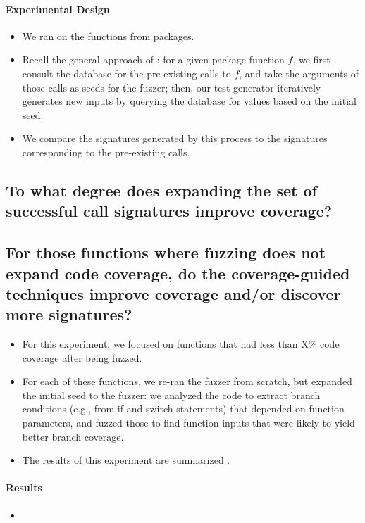 \paragraph{Experimental Design}
\begin{itemize}
    \item We ran \tool on the   functions from  packages.
    \item Recall the general approach of \tool: for a given package function $f$, we first consult the database for the pre-existing calls to $f$, and take the arguments of those calls as seeds for the fuzzer; then, our test generator iteratively generates new inputs by querying the database for values based on the initial seed.
    \item We compare the signatures generated by this process to the signatures corresponding to the pre-existing calls.
\end{itemize}

%
%

\subsection{To what degree does expanding the set of successful call signatures improve coverage?}

%
%
\subsection{For those functions where fuzzing does not expand code coverage, do the coverage-guided techniques improve coverage and/or discover more signatures?}

\begin{itemize}
    \item For this experiment, we focused on functions that had less than X\% code coverage after being fuzzed.
    \item For each of these functions, we re-ran the fuzzer from scratch, but expanded the initial seed to the fuzzer: we analyzed the code to extract branch conditions (e.g., from if and switch statements) that depended on function parameters, and fuzzed those to find function inputs that were likely to yield better branch coverage.
    \item The results of this experiment are summarized .
\end{itemize}

\paragraph{Results}

\begin{itemize}
    \item {}
\end{itemize}